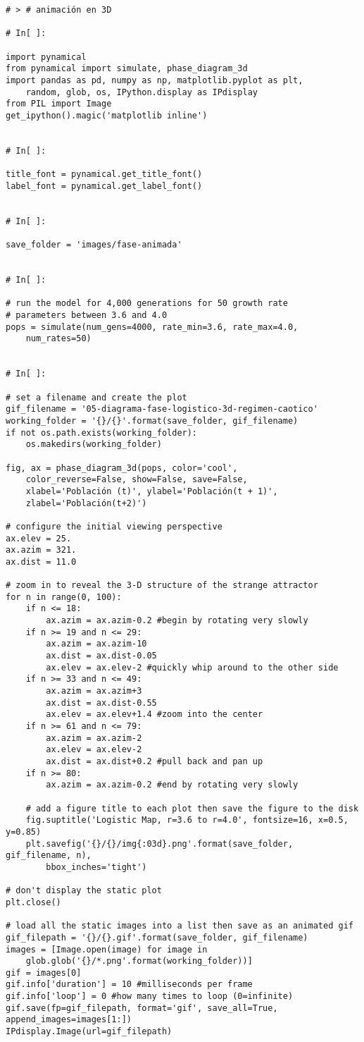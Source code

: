 \begin{verbatim}
# > # animación en 3D

# In[ ]:

import pynamical
from pynamical import simulate, phase_diagram_3d
import pandas as pd, numpy as np, matplotlib.pyplot as plt,
	random, glob, os, IPython.display as IPdisplay
from PIL import Image
get_ipython().magic('matplotlib inline')


# In[ ]:

title_font = pynamical.get_title_font()
label_font = pynamical.get_label_font()


# In[ ]:

save_folder = 'images/fase-animada'


# In[ ]:

# run the model for 4,000 generations for 50 growth rate 
# parameters between 3.6 and 4.0
pops = simulate(num_gens=4000, rate_min=3.6, rate_max=4.0, 
	num_rates=50)

 
# In[ ]:

# set a filename and create the plot
gif_filename = '05-diagrama-fase-logistico-3d-regimen-caotico'
working_folder = '{}/{}'.format(save_folder, gif_filename)
if not os.path.exists(working_folder):
    os.makedirs(working_folder)
    
fig, ax = phase_diagram_3d(pops, color='cool',
	color_reverse=False, show=False, save=False,
    xlabel='Población (t)', ylabel='Población(t + 1)',
    zlabel='Población(t+2)')

# configure the initial viewing perspective
ax.elev = 25.
ax.azim = 321.
ax.dist = 11.0

# zoom in to reveal the 3-D structure of the strange attractor
for n in range(0, 100):
    if n <= 18:
        ax.azim = ax.azim-0.2 #begin by rotating very slowly
    if n >= 19 and n <= 29:
        ax.azim = ax.azim-10
        ax.dist = ax.dist-0.05
        ax.elev = ax.elev-2 #quickly whip around to the other side
    if n >= 33 and n <= 49:
        ax.azim = ax.azim+3
        ax.dist = ax.dist-0.55
        ax.elev = ax.elev+1.4 #zoom into the center
    if n >= 61 and n <= 79:
        ax.azim = ax.azim-2
        ax.elev = ax.elev-2
        ax.dist = ax.dist+0.2 #pull back and pan up
    if n >= 80:
        ax.azim = ax.azim-0.2 #end by rotating very slowly
    
    # add a figure title to each plot then save the figure to the disk
    fig.suptitle('Logistic Map, r=3.6 to r=4.0', fontsize=16, x=0.5, y=0.85)
    plt.savefig('{}/{}/img{:03d}.png'.format(save_folder, gif_filename, n),
    	bbox_inches='tight')

# don't display the static plot
plt.close()

# load all the static images into a list then save as an animated gif
gif_filepath = '{}/{}.gif'.format(save_folder, gif_filename)
images = [Image.open(image) for image in
	glob.glob('{}/*.png'.format(working_folder))]
gif = images[0]
gif.info['duration'] = 10 #milliseconds per frame
gif.info['loop'] = 0 #how many times to loop (0=infinite)
gif.save(fp=gif_filepath, format='gif', save_all=True, append_images=images[1:])
IPdisplay.Image(url=gif_filepath)
\end{verbatim}

\pagebreak
\newpage



